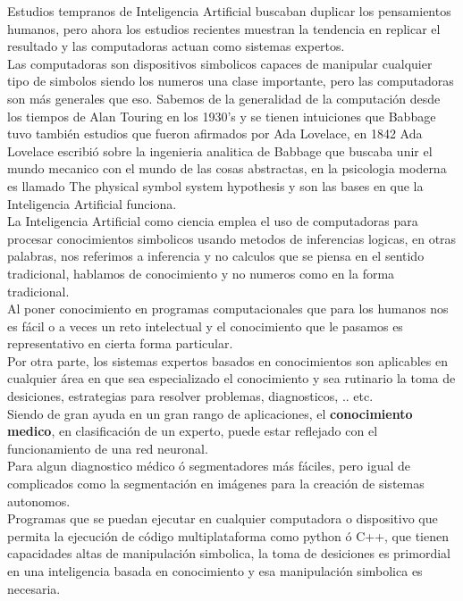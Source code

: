 \documentclass[a4paper, 11pt]{article}
\begin{document}
Estudios tempranos de Inteligencia Artificial buscaban duplicar los pensamientos humanos, pero ahora los estudios recientes muestran la tendencia en replicar el resultado y las computadoras actuan como sistemas expertos.\\

Las computadoras son dispositivos simbolicos capaces de manipular cualquier tipo de simbolos siendo los numeros una clase importante, pero las computadoras son más generales que eso. Sabemos de la generalidad de la computación desde los tiempos de Alan Touring en los 1930's y se tienen intuiciones que Babbage tuvo también estudios que fueron afirmados por Ada Lovelace, en 1842 Ada Lovelace escribió sobre la ingenieria analitica de Babbage que buscaba unir el mundo mecanico con el mundo de las cosas abstractas, en la psicologia moderna es llamado The physical symbol system hypothesis y son las bases en que la Inteligencia Artificial funciona.\\

La Inteligencia Artificial como ciencia emplea el uso de computadoras para procesar conocimientos simbolicos usando metodos de inferencias logicas, en otras palabras, nos referimos a inferencia y no calculos que se piensa en el sentido tradicional, hablamos de conocimiento y no numeros como en la forma tradicional.\\
Al poner conocimiento en programas computacionales que para los humanos nos es fácil o a veces un reto intelectual y el conocimiento que le pasamos es representativo en cierta forma particular.\\

Por otra parte, los sistemas expertos basados en conocimientos son aplicables en cualquier  área en que sea especializado el conocimiento y sea rutinario la toma de desiciones, estrategias para resolver problemas, diagnosticos, .. etc.\\
Siendo de gran ayuda en un gran rango de aplicaciones, el \textbf{conocimiento medico}, en clasificación de un experto, puede estar reflejado con el funcionamiento de una red neuronal.\\

Para algun diagnostico médico ó segmentadores más fáciles, pero igual de complicados como la segmentación en imágenes para la creación de sistemas autonomos.\\

Programas que se puedan ejecutar en cualquier computadora o dispositivo que permita la ejecución de código multiplataforma como python ó C++, que tienen capacidades altas de manipulación simbolica, la toma de desiciones es primordial en una inteligencia basada en conocimiento y esa manipulación simbolica es necesaria.
\end{document}
